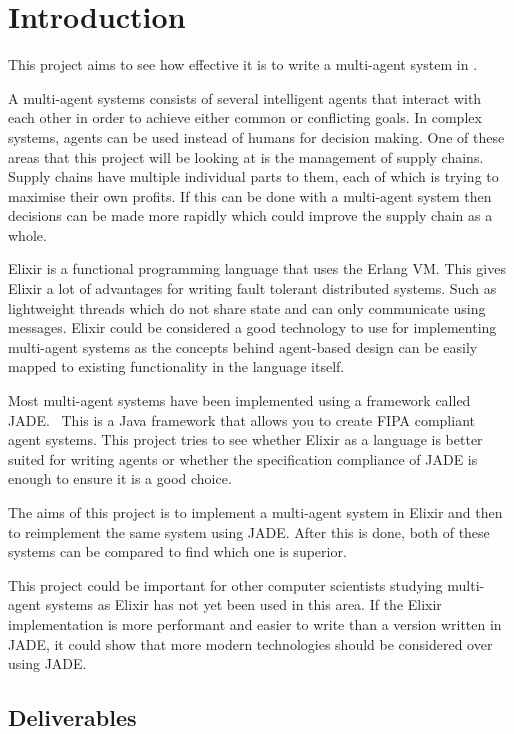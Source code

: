 \section{Introduction}

This project aims to see how effective it is to write a multi-agent system in .

A multi-agent systems consists of several intelligent agents that interact with each other in order to achieve either common or conflicting goals.
In complex systems, agents can be used instead of humans for decision making.
One of these areas that this project will be looking at is the management of supply chains.
Supply chains have multiple individual parts to them, each of which is trying to maximise their own profits.
If this can be done with a multi-agent system then decisions can be made more rapidly which could improve the supply chain as a whole.

Elixir is a functional programming language that uses the Erlang VM\@.
This gives Elixir a lot of advantages for writing fault tolerant distributed systems.
Such as lightweight threads which do not share state and can only communicate using messages.
Elixir could be considered a good technology to use for implementing multi-agent systems as the concepts behind agent-based design can be easily mapped to existing functionality in the language itself.

Most multi-agent systems have been implemented using a framework called JADE\@.~\cite{bellifemine1999jade}
This is a Java framework that allows you to create FIPA compliant agent systems.
This project tries to see whether Elixir as a language is better suited for writing agents or whether the specification compliance of JADE is enough to ensure it is a good choice.

The aims of this project is to implement a multi-agent system in Elixir and then to reimplement the same system using JADE\@.
After this is done, both of these systems can be compared to find which one is superior.

This project could be important for other computer scientists studying multi-agent systems as Elixir has not yet been used in this area.
If the Elixir implementation is more performant and easier to write than a version written in JADE, it could show that more modern technologies should be considered over using JADE\@.

\subsection{Deliverables}

